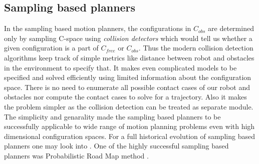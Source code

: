 \documentclass[MTech]{iitmdiss}
\begin{document}
\subsection{Sampling based planners}
In the sampling based motion planners, the configurations in \emph{$C_{obs}$} are determined only by sampling C-space using \emph{collision detectors} which would tell us whether a given configuration is a part of $C_{free}$ or $C_{obs}$. Thus the modern collision detection algorithms keep track of simple metrics like distance between robot and obstacles in the environment to specify that. It makes even complicated models to be specified and solved efficiently using limited information about the configuration space. There is no need to enumerate all possible contact cases of our robot and obstacles nor compute the contact cases to solve for a trajectory. Also it makes the problem simpler as the collision detection can be treated as separate module. The simplicity and genarality made the sampling based planners to be successfully applicable to wide range of motion planning problems even with high dimensional configuration spaces. For a full historical evolution of sampling based
 planners one may look into \cite{linde05}. One of the highly successful sampling based planners was Probabilistic Road Map method \cite{kavraki96}. 
 
\end{document}
